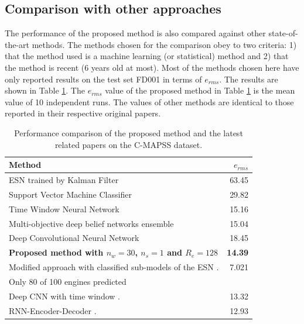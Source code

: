 \documentclass[preprint,12pt]{elsarticle}%
\begin{document}

\subsection{Comparison with other approaches}

The performance of the proposed method is also compared against
other state-of-the-art methods. The methods chosen for the comparison obey to two criteria: 1) that the method used is a machine learning (or statistical) method and 2) that the method is recent (6 years old at most). Most of the methods chosen here 
have only reported results on the test set FD001 in terms of
$e_{rms}$. The results are shown in Table \ref{table:results_comparison}. The
$e_{rms}$ value of the proposed method in Table \ref{table:results_comparison}
is the mean value of 10 independent runs. The values of other methods are
identical to those reported in their respective original papers.

\begin{table}[!htb]
\begin{center}
\begin{tabular}[c]{l|r}\hline
Method & $e_{rms}$\\\hline
ESN trained by Kalman Filter \cite{Peng2012} & 63.45\\
Support Vector Machine Classifier \cite{Louen2013} & 29.82\\
Time Window Neural Network \cite{Lim2016} & 15.16\\
Multi-objective deep belief networks ensemble \cite{Zhang2016} & 15.04\\
Deep Convolutional Neural Network \cite{Babu2016} & 18.45\\
\textbf{Proposed method with $n_{w}=30$, $n_{s}=1$ and $R_{e}=128$} & \textbf{14.39}\\
Modified approach with classified sub-models of the ESN \cite{Peng2012}. & 7.021\\
Only 80 of 100 engines predicted & \\
Deep CNN with time window \cite{Li2018}. & 13.32\\
RNN-Encoder-Decoder \cite{Malhorta2016}. & 12.93\\
\hline
\end{tabular}
\caption{Performance comparison of the proposed method and the latest related papers on the C-MAPSS dataset.}
\label{table:results_comparison}
\end{center}
\end{table}
\end{document}
